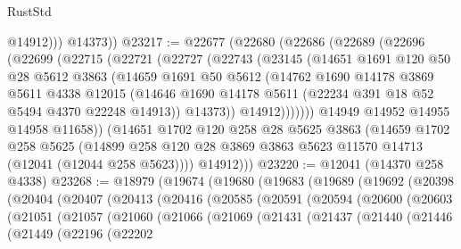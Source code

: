 \begin{lexlean}{RustStd}
\begin{coremodule}
              @14912)))
        @14373))
@23217 := @22677
    (@22680
      (@22686
        (@22689
          (@22696
            (@22699
              (@22715
                (@22721
                  (@22727
                    (@22743
                      (@23145
                        (@14651
                          @1691
                          @120
                          @50
                          @28
                          @5612
                          @3863
                          (@14659
                            @1691
                            @50
                            @5612
                            (@14762
                              @1690
                              @14178
                              @3869
                              @5611
                              @4338
                              @12015
                              (@14646
                                @1690
                                @14178
                                @5611
                                (@22234 @391 @18 @52 @5494 @4370 @22248 @14913))
                              @14373))
                          @14912)))))))
            @14949
            @14952
            @14955
            @14958
            @11658))
        (@14651
          @1702
          @120
          @258
          @28
          @5625
          @3863
          (@14659
            @1702
            @258
            @5625
            (@14899 @258 @120 @28 @3869 @3863 @5623 @11570 @14713 (@12041 (@12044 @258 @5623))))
          @14912)))
@23220 := @12041 (@14370 @258 @4338)
@23268 := @18979
    (@19674
      (@19680
        (@19683
          (@19689
            (@19692
              (@20398
                (@20404
                  (@20407
                    (@20413
                      (@20416
                        (@20585
                          (@20591
                            (@20594
                              (@20600
                                (@20603
                                  (@21051
                                    (@21057
                                      (@21060
                                        (@21066
                                          (@21069
                                            (@21431
                                              (@21437
                                                (@21440
                                                  (@21446
                                                    (@21449
                                                      (@22196
                                                        (@22202

\end{coremodule}
\end{lexlean}
